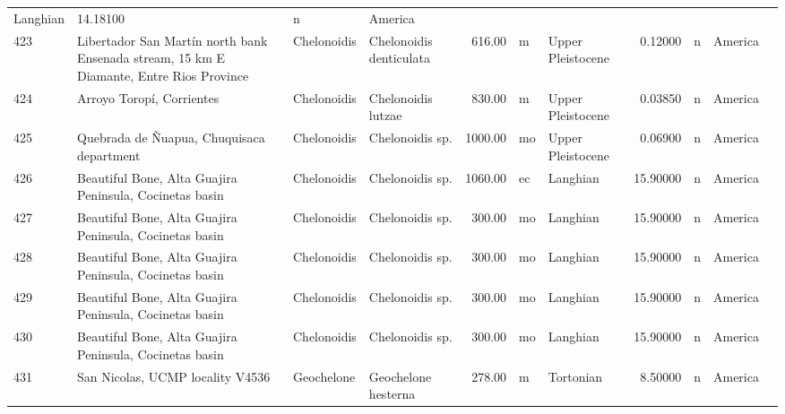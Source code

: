 \begin{landscape}
{\begin{longtable}[]{@{}llllrllrlll@{}}
	Langhian & 14.18100 & n & America\tabularnewline
	423 & Libertador San Martín north bank Ensenada stream, 15 km E
	Diamante, Entre Rios Province & Chelonoidis & Chelonoidis denticulata &
	616.00 & m & Upper Pleistocene & 0.12000 & n & America\tabularnewline
	424 & Arroyo Toropí, Corrientes & Chelonoidis & Chelonoidis lutzae &
	830.00 & m & Upper Pleistocene & 0.03850 & n & America\tabularnewline
	425 & Quebrada de Ñuapua, Chuquisaca department & Chelonoidis &
	Chelonoidis sp. & 1000.00 & mo & Upper Pleistocene & 0.06900 & n &
	America\tabularnewline
	426 & Beautiful Bone, Alta Guajira Peninsula, Cocinetas basin &
	Chelonoidis & Chelonoidis sp. & 1060.00 & ec & Langhian & 15.90000 & n &
	America\tabularnewline
	427 & Beautiful Bone, Alta Guajira Peninsula, Cocinetas basin &
	Chelonoidis & Chelonoidis sp. & 300.00 & mo & Langhian & 15.90000 & n &
	America\tabularnewline
	428 & Beautiful Bone, Alta Guajira Peninsula, Cocinetas basin &
	Chelonoidis & Chelonoidis sp. & 300.00 & mo & Langhian & 15.90000 & n &
	America\tabularnewline
	429 & Beautiful Bone, Alta Guajira Peninsula, Cocinetas basin &
	Chelonoidis & Chelonoidis sp. & 300.00 & mo & Langhian & 15.90000 & n &
	America\tabularnewline
	430 & Beautiful Bone, Alta Guajira Peninsula, Cocinetas basin &
	Chelonoidis & Chelonoidis sp. & 300.00 & mo & Langhian & 15.90000 & n &
	America\tabularnewline
	431 & San Nicolas, UCMP locality V4536 & Geochelone & Geochelone
	hesterna & 278.00 & m & Tortonian & 8.50000 & n & America\tabularnewline
	\bottomrule
\end{longtable}
}

\end{landscape}